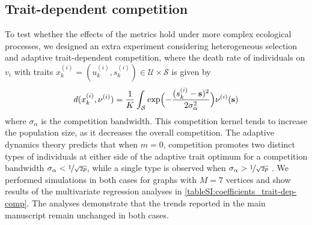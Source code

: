 \subsection{Trait-dependent competition}\label{secSI:trait-dep-comp}
To test whether the effects of the metrics hold under more complex ecological processes, we designed an extra experiment considering heterogeneous selection and adaptive trait-dependent competition, where the death rate of individuals on $v_i$ with traits $x_k^{(i)} = (u_k^{(i)}, s_k^{(i)}) \in \mathcal{U} \times \mathcal{S}$ is given by
\begin{equation}
    d(x_k^{(i)}, \nu^{(i)}) = \frac{1}{K}\int_{\mathcal{S}} \exp\Bigl(-\frac{(s_k^{(i)} - {\textbf s})^2}{2\sigma_\alpha^{2}} \Bigr) \nu^{(i)}({\textbf s})
\end{equation}
where $\sigma_\alpha$ is the competition bandwidth.
This competition kernel tends to increase the population size, as it decreases the overall competition. The adaptive dynamics theory predicts that when $m = 0$, competition promotes two distinct types of individuals at either side of the adaptive trait optimum for a competition bandwidth $\sigma_\alpha < \nicefrac{1}{\sqrt{2p}}$, while a single type is observed when $\sigma_\alpha > \nicefrac{1}{\sqrt{2p}}$ \cite{DoebeliMichael2011Ad}.
We performed simulations in both cases for graphs with $M=7$ vertices and show results of the multivariate regression analyses in \cref{tableSI:coefficients_trait-dep-comp}.
The analyses demonstrate that the trends reported in the main manuscript remain unchanged in both cases.

